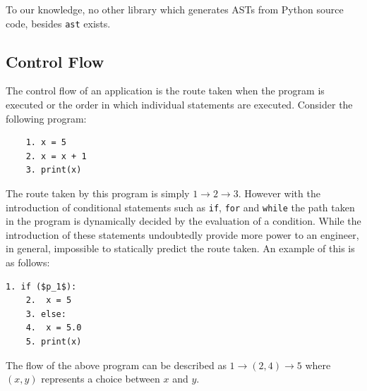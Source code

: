 \documentclass[12pt, titlepage]{article}
\begin{document}
\indent To our knowledge, no other library which generates ASTs from Python source code, besides \texttt{ast} exists.

\subsection{Control Flow}
The control flow of an application is the route taken when the program is executed or the order in which individual statements are executed. Consider the following program:
\begin{lstlisting}
	1. x = 5
	2. x = x + 1
	3. print(x)
\end{lstlisting}
The route taken by this program is simply $1 \rightarrow 2 \rightarrow 3$. However with the introduction of conditional statements such as \texttt{if}, \texttt{for} and \texttt{while} the path taken in the program is dynamically decided by the evaluation of a condition. While the introduction of these statements undoubtedly provide more power to an engineer, in general, impossible to statically predict the route taken. An example of this is as follows:
\begin{lstlisting}[mathescape]
	1. if ($p_1$):
	2. 	x = 5
	3. else:
	4. 	x = 5.0
	5. print(x)
\end{lstlisting}
The flow of the above program can be described as $1 \rightarrow (2, 4) \rightarrow 5$ where $(x, y)$ represents a choice between $x$ and $y$.
\end{document}
